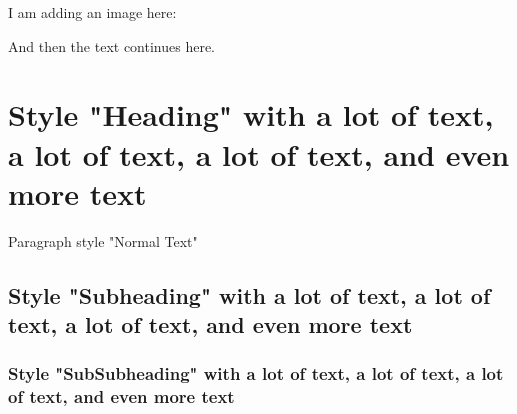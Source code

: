 I am adding an image here:

\renewcommand{\varCaption}{This is an image with the caption: There are three minutes left on the clock.}
\renewcommand{\varImgPath}{_content/images/3minutes700x400.jpg}


And then the text continues here.
\lipsum[3]
 
\chapter{Style "Heading" with a lot of text, a lot of text, a lot of
text, and even more text}
Paragraph style "Normal Text" \lipsum[1]
\section{Style "Subheading" with a lot of text, a lot of text, a
lot of text, and even more text}
\lipsum[1]
\subsection{Style "SubSubheading" with a lot of text, a lot of text, a
lot of text, and even more text}
\lipsum[1]